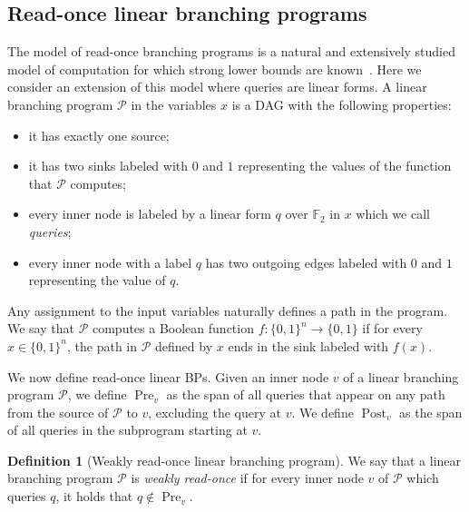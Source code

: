 \documentclass[a4paper,11pt,draft]{article}
\theoremstyle{definition}
\newtheorem{definition}[theorem]{Definition}
\theoremstyle{remark}
\DeclareMathOperator{\pre}{Pre}
\DeclareMathOperator{\post}{Post}
\newcommand{\Q}{{\{0,1\}}}
\newcommand{\bbF}{\mathbb{F}}
\newcommand{\calP}{\mathcal{P}}
\newcommand{\wreadonce}{weakly read-once}
\newcommand{\Wreadonce}{Weakly read-once}
\newcommand{\readonce}{read-once}
\newcommand{\Readonce}{Read-once}
\begin{document}





\subsection{\Readonce{} linear branching programs}

The model of read-once branching programs is a natural and extensively studied model of computation for which strong lower bounds are known~\cite{DBLP:journals/tcs/SavickyZ00,DBLP:conf/icalp/AndreevBCR99}. Here we consider an extension of this model where queries are linear forms. A linear branching program $\calP$ in the variables $x$ is a DAG with the following properties:
\begin{itemize}
  \item it has exactly one source;
  \item it has two sinks labeled with $0$ and $1$ representing the values of the function that $\calP$ computes;
  \item every inner node is labeled by a linear form $q$ over $\bbF_2$ in $x$ which we call \emph{queries};
  \item every inner node with a label $q$ has two outgoing edges labeled with $0$ and $1$ representing the value of $q$.
\end{itemize}

Any assignment to the input variables naturally defines a path in the program. We say that $\calP$ computes a Boolean function $f\colon \Q^n \to \Q$ if for every $x \in \Q^n$, the path in $\calP$ defined by $x$ ends in the sink labeled with $f(x)$.

We now define \readonce{} linear BPs. Given an inner node $v$ of a linear branching program $\calP$, we define $\pre_v$ as the span of all queries that appear on any path from the source of $\calP$ to $v$, excluding the query at $v$. We define $\post_v$ as the span of all queries in the subprogram starting at $v$. 

\begin{definition}[\Wreadonce{} linear branching program]
We say that a linear branching program $\calP$ is \emph{\wreadonce} if for every inner node $v$ of $\calP$ which queries $q$, it holds that $q \not \in \pre_v$.
\end{definition}
\end{document}
